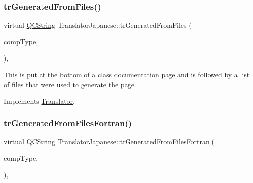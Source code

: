 \mbox{\label{class_translator_japanese_a7fb359b2893fe33fd41ebde830eb8461}} 
\subsubsection{\texorpdfstring{trGeneratedFromFiles()}{trGeneratedFromFiles()}}
{\footnotesize\ttfamily virtual \mbox{\hyperlink{class_q_c_string}{Q\+C\+String}} Translator\+Japanese\+::tr\+Generated\+From\+Files (\begin{DoxyParamCaption}\item[{\mbox{\hyperlink{class_class_def_ae70cf86d35fe954a94c566fbcfc87939}{Class\+Def\+::\+Compound\+Type}}}]{comp\+Type,  }\item[{bool}]{ }\end{DoxyParamCaption})\hspace{0.3cm}{\ttfamily [inline]}, {\ttfamily [virtual]}}

This is put at the bottom of a class documentation page and is followed by a list of files that were used to generate the page. 

Implements \mbox{\hyperlink{class_translator}{Translator}}.

\mbox{\label{class_translator_japanese_a21b41a1dce30b8cbca15050d62ba62b2}} 
\subsubsection{\texorpdfstring{trGeneratedFromFilesFortran()}{trGeneratedFromFilesFortran()}}
{\footnotesize\ttfamily virtual \mbox{\hyperlink{class_q_c_string}{Q\+C\+String}} Translator\+Japanese\+::tr\+Generated\+From\+Files\+Fortran (\begin{DoxyParamCaption}\item[{\mbox{\hyperlink{class_class_def_ae70cf86d35fe954a94c566fbcfc87939}{Class\+Def\+::\+Compound\+Type}}}]{comp\+Type,  }\item[{bool}]{ }\end{DoxyParamCaption})\hspace{0.3cm}{\ttfamily [inline]}, {\ttfamily [virtual]}}

